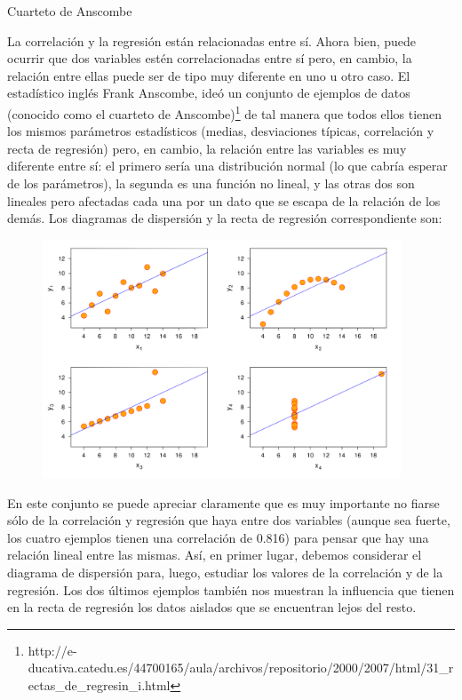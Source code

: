 \begin{myexampleblock}{Cuarteto de Anscombe}

La correlación y la regresión están relacionadas entre sí. Ahora bien, puede ocurrir que dos variables estén correlacionadas entre sí pero, en cambio, la relación entre ellas puede ser de tipo muy diferente en uno u otro caso. El estadístico inglés Frank Anscombe, ideó un conjunto de ejemplos de datos (conocido como el cuarteto de Anscombe)\footnote{\scriptsize{http://e-ducativa.catedu.es/44700165/aula/archivos/repositorio/2000/2007/html/31\_rectas\_de\_regresin\_i.html}} de tal manera que todos ellos tienen los mismos parámetros estadísticos (medias, desviaciones típicas, correlación y recta de regresión) pero, en cambio, la relación entre las variables es muy diferente entre sí: el primero sería una distribución normal (lo que cabría esperar de los parámetros), la segunda es una función no lineal, y las otras dos son lineales pero afectadas cada una por un dato que se escapa de la relación de los demás. Los diagramas de dispersión y la recta de regresión correspondiente son:

	
	
	\begin{figure}[H]
			\centering
			\includegraphics[width=0.95\textwidth]{imagenes/imagenes03/T03IM22.png}
	\end{figure}
	
	\vspace{-5mm}%
	En este conjunto se puede apreciar claramente que es muy importante no fiarse sólo de la correlación y regresión que haya entre dos variables (aunque sea fuerte, los cuatro ejemplos tienen una correlación de 0.816) para pensar que hay una relación lineal entre las mismas. Así, en primer lugar, debemos considerar el diagrama de dispersión para, luego, estudiar los valores de la correlación y de la regresión. Los dos últimos ejemplos también nos muestran la influencia que tienen en la recta de regresión los datos aislados que se encuentran lejos del resto.


\end{myexampleblock}
